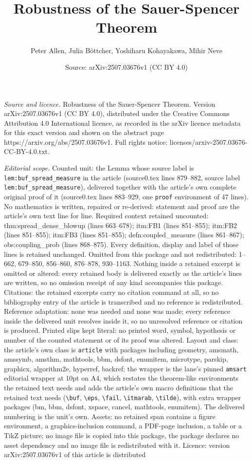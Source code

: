 \documentclass[10pt,a4paper]{amsart}
\title[Robustness of the Sauer-Spencer Theorem]{Robustness of the Sauer-Spencer Theorem}
\author{Peter Allen, Julia B\"ottcher, Yoshiharu Kohayakawa, Mihir Neve}
\date{Source: arXiv:2507.03676v1 (CC BY 4.0)}
\begin{document}
\maketitle

\noindent\emph{Source and licence.} Robustness of the Sauer-Spencer Theorem. Version arXiv:2507.03676v1 (CC BY 4.0), distributed under the Creative Commons Attribution 4.0 International licence, as recorded in the arXiv licence metadata for this exact version and shown on the abstract page https://arxiv.org/abs/2507.03676v1. Full rights notice: licenses/arxiv-2507.03676-CC-BY-4.0.txt.\par\smallskip

\noindent\textit{Editorial scope.} Counted unit: the Lemma whose source label is \texttt{lem:buf\_spread\_measure} in the article (source0.tex lines 879--882, source label \texttt{lem:buf\_spread\_measure}), delivered together with the article's own complete original proof of it (source0.tex lines 883--929, one \texttt{proof} environment of 47 lines). No mathematics is written, repaired or re-derived: statement and proof are the article's own text line for line. Required context retained uncounted: thm:spread\_dense\_blowup (lines 663--678); itm:FB1 (lines 851--855); itm:FB2 (lines 851--855); itm:FB3 (lines 851--855); defn:coupled\_measure (lines 861--867); obs:coupling\_prob (lines 868--875). Every definition, display and label of those lines is retained unchanged. Omitted from this package and not redistributed: 1--662, 679--850, 856--860, 876--878, 930--1163. Nothing inside a retained excerpt is omitted or altered: every retained body is delivered exactly as the article's lines are written, so no omission receipt of any kind accompanies this package. Citations: the retained excerpts carry no citation command at all, so no bibliography entry of the article is transcribed and no reference is redistributed. Reference adaptation: none was needed and none was made; every reference inside the delivered unit resolves inside it, so no unresolved reference or citation is produced. Printed slips kept literal: no printed word, symbol, hypothesis or number of the counted statement or of its proof was altered. Layout and class: the article's own class is \texttt{article} with packages including geometry, amsmath, amssymb, amsthm, mathtools, bbm, dsfont, enumitem, microtype, parskip, graphicx, algorithm2e, hyperref, backref; the wrapper is the lane's pinned \texttt{amsart} editorial wrapper at 10pt on A4, which restates the theorem-like environments the retained text needs and adds the article's own macro definitions that the retained text needs (\texttt{\textbackslash buf}, \texttt{\textbackslash eps}, \texttt{\textbackslash fail}, \texttt{\textbackslash itmarab}, \texttt{\textbackslash tilde}), with extra wrapper packages (bm, bbm, dsfont, xspace, cancel, mathtools, enumitem). The delivered numbering is the unit's own. Assets: no retained span contains a figure environment, a graphics-inclusion command, a PDF-page inclusion, a table or a TikZ picture; no image file is copied into this package, the package declares no asset dependency and no image file is redistributed with it. Licence: version arXiv:2507.03676v1 of this article is distributed 
\end{document}
